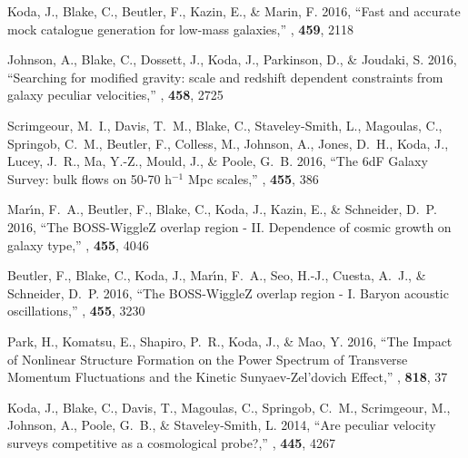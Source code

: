 \begin{thebibliography}{8}
{Koda}, J., {Blake}, C., {Beutler}, F., {Kazin}, E., \& {Marin}, F. 2016,
  ``{Fast and accurate mock catalogue generation for low-mass galaxies},'' {\em
  \mnras\/}, {\bf 459}, 2118

{Johnson}, A., {Blake}, C., {Dossett}, J., {Koda}, J., {Parkinson}, D., \&
  {Joudaki}, S. 2016, ``{Searching for modified gravity: scale and redshift
  dependent constraints from galaxy peculiar velocities},'' {\em \mnras\/},
  {\bf 458}, 2725

{Scrimgeour}, M.~I., {Davis}, T.~M., {Blake}, C., {Staveley-Smith}, L.,
  {Magoulas}, C., {Springob}, C.~M., {Beutler}, F., {Colless}, M., {Johnson},
  A., {Jones}, D.~H., {Koda}, J., {Lucey}, J.~R., {Ma}, Y.-Z., {Mould}, J., \&
  {Poole}, G.~B. 2016, ``{The 6dF Galaxy Survey: bulk flows on 50-70 h$^{-1}$
  Mpc scales},'' {\em \mnras\/}, {\bf 455}, 386

{Mar{\'{\i}}n}, F.~A., {Beutler}, F., {Blake}, C., {Koda}, J., {Kazin}, E., \&
  {Schneider}, D.~P. 2016, ``{The BOSS-WiggleZ overlap region - II. Dependence
  of cosmic growth on galaxy type},'' {\em \mnras\/}, {\bf 455}, 4046

{Beutler}, F., {Blake}, C., {Koda}, J., {Mar{\'{\i}}n}, F.~A., {Seo}, H.-J.,
  {Cuesta}, A.~J., \& {Schneider}, D.~P. 2016, ``{The BOSS-WiggleZ overlap
  region - I. Baryon acoustic oscillations},'' {\em \mnras\/}, {\bf 455}, 3230

{Park}, H., {Komatsu}, E., {Shapiro}, P.~R., {Koda}, J., \& {Mao}, Y. 2016,
  ``{The Impact of Nonlinear Structure Formation on the Power Spectrum of
  Transverse Momentum Fluctuations and the Kinetic Sunyaev-Zel'dovich
  Effect},'' {\em \apj\/}, {\bf 818}, 37

{Koda}, J., {Blake}, C., {Davis}, T., {Magoulas}, C., {Springob}, C.~M.,
  {Scrimgeour}, M., {Johnson}, A., {Poole}, G.~B., \& {Staveley-Smith}, L.
  2014, ``{Are peculiar velocity surveys competitive as a cosmological
  probe?},'' {\em \mnras\/}, {\bf 445}, 4267


\end{thebibliography}
